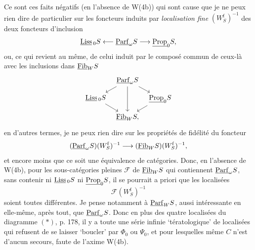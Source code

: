 Ce sont ces faits négatifs (en l’absence de W(4b)) qui sont cause que je ne peux rien dire de particulier sur les foncteurs induits par \textit{localisation fine} $(W^{\mathrm{f}}_S)^{-1}$ des deux foncteurs d’inclusion
\[
\underline{\mathrm{Liss}}\,_0 S \longleftarrow \underline{\mathrm{Parf}}_\omega S \longrightarrow \underline{\mathrm{Prop}}_0 S,
\]
ou, ce qui revient au même, de celui induit par le composé commun de ceux-là avec les inclusions dans $\underline{\mathrm{Fib}}_W S$
\[
\begin{tikzcd}[column sep=tiny, row sep=small]
 & \Parf_\omega S \arrow[dl] \arrow[dd] \arrow[dr] & \\
\Liss_0 S \arrow[dr] & & \Prop_0 S \arrow[dl] \\
 & \Fib_W S, &
\end{tikzcd}
\]
en d’autres termes, je ne peux rien dire sur les propriétés de fidélité du foncteur
\[
(\underline{\mathrm{Parf}}_\omega S)(W^{\mathrm{f}}_S)^{-1} \longrightarrow (\underline{\mathrm{Fib}}_W S)(W^{\mathrm{f}}_S)^{-1},
\]
et encore moins que ce soit une équivalence de catégories. Donc, en l’absence de W(4b), pour les sous-catégories pleines $\mathcal{F}$ de $\underline{\mathrm{Fib}}_W S$ qui contiennent $\underline{\mathrm{Parf}}_\omega S$, sans contenir ni $\underline{\mathrm{Liss}}\,_0 S$ ni $\underline{\mathrm{Prop}}_0 S$, il se pourrait a priori que les localisées
\[
\mathcal{F}(W^{\mathrm{f}}_S)^{-1}
\]
soient toutes différentes. Je pense notamment à $\underline{\mathrm{Parf}}_W S$, aussi intéressante en elle-même, après tout, que $\underline{\mathrm{Parf}}_\omega S$. Donc en plus des quatre localisées du diagramme $(\ast)$, p. 178, il y a toute une série infinie ‘tératologique’ de localisées
qui refusent de se laisser ‘boucler’ par $\Phi_0$ ou $\Psi_0$, et pour lesquelles même $C$ n’est d’aucun secours, faute de l’axime W(4b). %

